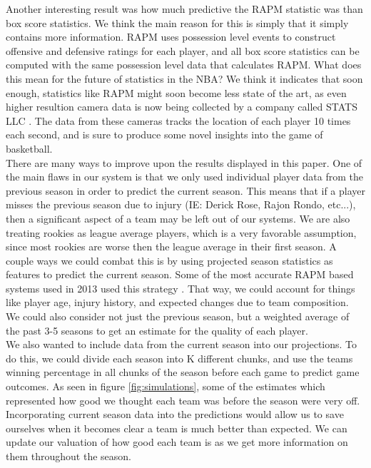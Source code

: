 \documentclass{article} %
\begin{document}
Another interesting result was how much predictive the RAPM statistic was than box score statistics. We think the main reason for this is simply that it simply contains more information. RAPM uses possession level events to construct offensive and defensive ratings for each player, and all box score statistics can be computed with the same possession level data that calculates RAPM. What does this mean for the future of statistics in the NBA? We think it indicates that soon enough, statistics like RAPM might soon become less state of the art, as even higher resultion camera data is now being collected by a company called STATS LLC \cite{sportsvu}. The data from these cameras tracks the location of each player 10 times each second, and is sure to produce some novel insights into the game of basketball. \\

There are many ways to improve upon the results displayed in this paper. One of the main flaws in our system is that we only used individual player data from the previous season in order to predict the current season. This means that if a player misses the previous season due to injury (IE: Derick Rose, Rajon Rondo, etc...), then a significant aspect of a team may be left out of our systems. We are also treating rookies as league average players, which is a very favorable assumption, since most rookies are worse then the league average in their first season. A couple ways we could combat this is by using projected season statistics as features to predict the current season. Some of the most accurate RAPM based systems used in 2013 used this strategy \cite{projections}. That way, we could account for things like player age, injury history, and expected changes due to team composition. We could also consider not just the previous season, but a weighted average of the past 3-5 seasons to get an estimate for the quality of each player. \\

We also wanted to include data from the current season into our projections. To do this, we could divide each season into K different chunks, and use the teams winning percentage in all chunks of the season before each game to predict game outcomes. As seen in figure \ref{fig:simulations}, some of the estimates which represented how good we thought each team was before the season were very off. Incorporating current season data into the predictions would allow us to save ourselves when it becomes clear a team is much better than expected. We can update our valuation of how good each team is as we get more information on them throughout the season. 
\end{document}
